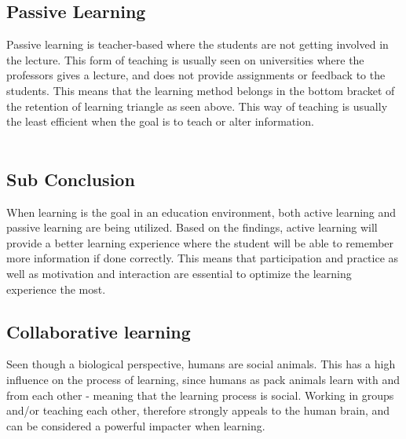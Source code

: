 \subsection*{Passive Learning}
Passive learning is teacher-based where the students are not getting involved in the lecture. This form of teaching is usually seen on universities where the professors gives a lecture, and does not provide assignments or feedback to the students. This means that the learning method belongs in the bottom bracket of the retention of learning triangle as seen above. This way of teaching is usually the least efficient when the goal is to teach or alter information\cite{learning}.\\
\\
\subsection*{Sub Conclusion}
When learning is the goal in an education environment, both active learning and passive learning are being utilized. Based on the findings, active learning will provide a better learning experience where the student will be able to remember more information if done correctly. This means that participation and practice as well as motivation and interaction are essential to optimize the learning experience the most.

\subsection{Collaborative learning}

Seen though a biological perspective, humans are social animals\cite{laeringIPraksis}. This has a high influence on the process of learning, since humans as pack animals learn with and from each other - meaning that the learning process is social\cite{laeringIPraksis}. Working in groups and/or teaching each other, therefore strongly appeals to the human brain, and can be considered a powerful impacter when learning\cite{laeringIPraksis}.        

